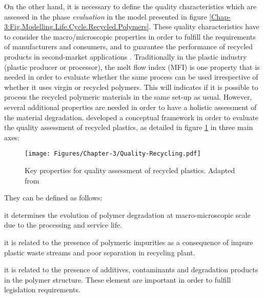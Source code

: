 On the other hand, it is necessary to define the quality characteristics which are assessed in the phase \textit{evaluation} in the model presented in figure \ref{Chap-3:Fig.Modelling.Life.Cycle.Recycled.Polymers}.
These quality characteristics  have to consider  the macro/microscopic properties  in order to fulfill the requirements of manufacturers and consumers, and to guarantee the performance of recycled products in second-market applications \parencite{Karlsson2004}.
Traditionally in the plastic industry (plastic  producer or processor), the melt flow index (MFI)  is one property that is needed in order to evaluate whether the same process can be used irrespective of whether it uses virgin or recycled polymers. 
This will indicates if it is possible to process the recycled polymeric materials in the same set-up as usual. 
However, several additional properties are needed in order to have a holistic assessment of the  material degradation.
\textcite{Vilaplana2008,Karlsson2004} developed  a conceptual framework  in order to evaluate the quality assessment of recycled plastics, as detailed in figure \ref{Chap-3:Fig.Quality.Recycling} in three main axes:

\begin{figure}[!htb]
	\centering
	\texttt{[image: Figures/Chapter-3/Quality-Recycling.pdf]}
	\caption{Key properties for quality assessment of recycled plastics. Adapted from \parencite{Vilaplana2008,Karlsson2004}}
	\label{Chap-3:Fig.Quality.Recycling}
\end{figure}

They can be defined as follows:

	
	\begin{description}[noitemsep]
				\item [\textit{Degree of degradation (DD):}] it determines the evolution of polymer degradation at macro-microscopic scale due to the processing and service life.
	
				\item[\textit{Degree of Mixing (DM):}] it is related to the presence of polymeric impurities  as a consequence of  impure plastic waste streams and poor separation in recycling plant.
		
				\item [\textit{Low molecular weight compounds (LMWC):}] it is related to the presence of additives, contaminants and degradation products in the polymer structure. These element are important in order to fulfill legislation requirements.
	\end{description}
	
